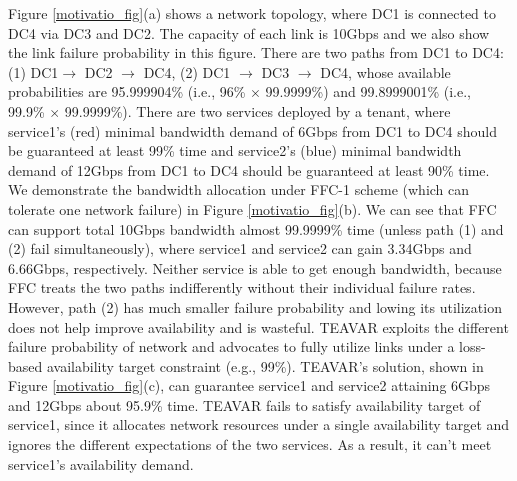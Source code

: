 \documentclass[sigconf]{acmart}
\begin{document}
Figure \ref{motivatio_fig}(a) shows a network topology, where DC1 is connected to DC4 via DC3 and DC2.
The capacity of each link is 10Gbps and we also show the link failure probability in this figure.
There are two paths from DC1 to DC4:
(1) DC1$\to$ DC2 $\to$ DC4, (2) DC1 $\to$ DC3 $\to$ DC4, whose available probabilities are 95.999904\% (i.e., 96\% $\times$ 99.9999\%) and 99.8999001\% (i.e., 99.9\% $\times$ 99.9999\%).
There are two services deployed by a tenant, where service1's (red) minimal bandwidth demand of 6Gbps from DC1 to DC4 should be guaranteed at least 99\% time and service2's (blue) minimal bandwidth demand of 12Gbps from DC1 to DC4 should be guaranteed at least 90\% time.
We demonstrate the bandwidth allocation under FFC-1 scheme (which can tolerate one network failure) in Figure \ref{motivatio_fig}(b).
We can see that FFC can support total 10Gbps bandwidth almost 99.9999\% time (unless path (1) and (2) fail simultaneously), where service1 and service2 can gain 3.34Gbps and 6.66Gbps, respectively.
Neither service is able to get enough bandwidth, because FFC treats the two paths indifferently without their individual failure rates.
However, path (2) has much smaller failure probability and lowing its utilization does not help improve availability and is wasteful.
TEAVAR exploits the different failure probability of network and advocates to fully utilize links under a loss-based availability target constraint (e.g., 99\%).
TEAVAR's solution, shown in Figure \ref{motivatio_fig}(c), can guarantee service1 and service2 attaining 6Gbps and 12Gbps about 95.9\% time.
TEAVAR fails to satisfy availability target of service1, since it allocates network resources under a single availability target and ignores the different expectations of the two services.
As a result, it can't meet service1's availability demand.
\fi
\end{document}
